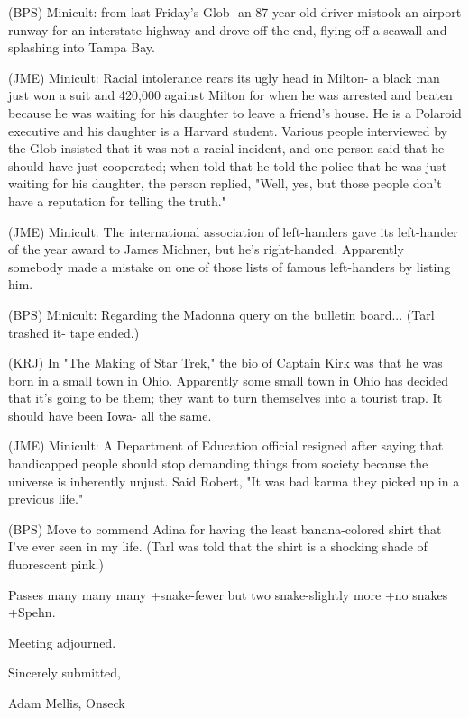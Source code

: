 \documentclass[12pt]{article}
\begin{document}
(BPS) Minicult: from last Friday's Glob- an 87-year-old driver mistook an airport runway for an interstate highway and drove off the end, flying off a seawall and splashing into Tampa Bay.

(JME) Minicult: Racial intolerance rears its ugly head in Milton- a black man just won a suit and 420,000 against Milton for when he was arrested and beaten because he was waiting for his daughter to leave a friend's house. He is a Polaroid executive and his daughter is a Harvard student. Various people interviewed by the Glob insisted that it was not a racial incident, and one person said that he should have just cooperated; when told that he told the police that he was just waiting for his daughter, the person replied, "Well, yes, but those people don't have a reputation for telling the truth."

(JME) Minicult: The international association of left-handers gave its left-hander of the year award to James Michner, but he's right-handed. Apparently somebody made a mistake on one of those lists of famous left-handers by listing him.

(BPS) Minicult: Regarding the Madonna query on the bulletin board... (Tarl trashed it- tape ended.)

(KRJ) In "The Making of Star Trek," the bio of Captain Kirk was that he was born in a small town in Ohio. Apparently some small town in Ohio has decided that it's going to be them; they want to turn themselves into a tourist trap. It should have been Iowa- all the same.

(JME) Minicult: A Department of Education official resigned after saying that handicapped people should stop demanding things from society because the universe is inherently unjust. Said Robert, "It was bad karma they picked up in a previous life."

(BPS) Move to commend Adina for having the least banana-colored shirt that I've ever seen in my life. (Tarl was told that the shirt is a shocking shade of fluorescent pink.)

Passes many many many +snake-fewer but two snake-slightly more +no snakes +Spehn.

\vspace{12pt}

\noindent
Meeting adjourned.

\vspace{18pt}

\centerline{Sincerely submitted,}
\centerline{Adam Mellis, Onseck}
\end{document}

